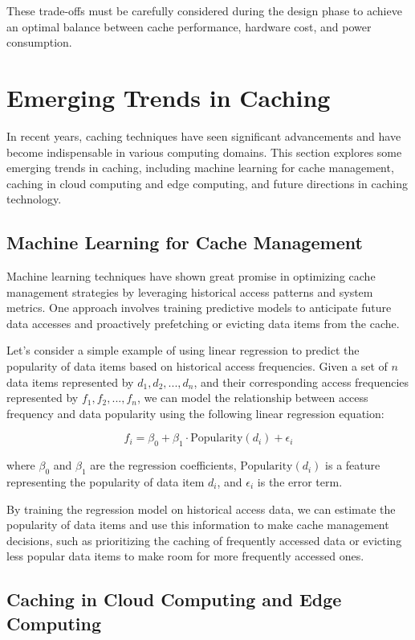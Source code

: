 \documentclass[12pt]{book} %
\begin{document}
These trade-offs must be carefully considered during the design phase to achieve an optimal balance between cache performance, hardware cost, and power consumption.


\section{Emerging Trends in Caching}

In recent years, caching techniques have seen significant advancements and have become indispensable in various computing domains. This section explores some emerging trends in caching, including machine learning for cache management, caching in cloud computing and edge computing, and future directions in caching technology.

\subsection{Machine Learning for Cache Management}

Machine learning techniques have shown great promise in optimizing cache management strategies by leveraging historical access patterns and system metrics. One approach involves training predictive models to anticipate future data accesses and proactively prefetching or evicting data items from the cache.

Let's consider a simple example of using linear regression to predict the popularity of data items based on historical access frequencies. Given a set of \(n\) data items represented by \(d_1, d_2, ..., d_n\), and their corresponding access frequencies represented by \(f_1, f_2, ..., f_n\), we can model the relationship between access frequency and data popularity using the following linear regression equation:

\[
f_i = \beta_0 + \beta_1 \cdot \text{Popularity}(d_i) + \epsilon_i
\]

where \(\beta_0\) and \(\beta_1\) are the regression coefficients, \(\text{Popularity}(d_i)\) is a feature representing the popularity of data item \(d_i\), and \(\epsilon_i\) is the error term.

By training the regression model on historical access data, we can estimate the popularity of data items and use this information to make cache management decisions, such as prioritizing the caching of frequently accessed data or evicting less popular data items to make room for more frequently accessed ones.

\subsection{Caching in Cloud Computing and Edge Computing}
\end{document}
